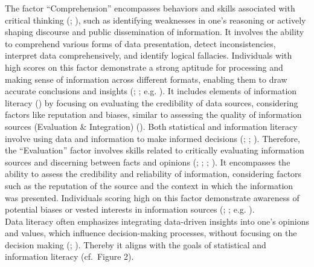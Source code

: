 \documentclass[
  12pt,
  a4paper,
  twoside]{article}
\begin{document}
The factor ``Comprehension'' encompasses behaviors and skills associated with critical thinking (; ), such as identifying weaknesses in one's reasoning or actively shaping discourse and public dissemination of information. It involves the ability to comprehend various forms of data presentation, detect inconsistencies, interpret data comprehensively, and identify logical fallacies. Individuals with high scores on this factor demonstrate a strong aptitude for processing and making sense of information across different formats, enabling them to draw accurate conclusions and insights (; ; e.g. ).
It includes elements of information literacy () by focusing on evaluating the credibility of data sources, considering factors like reputation and biases, similar to assessing the quality of information sources (Evaluation \& Integration) (). Both statistical and information literacy involve using data and information to make informed decisions (; ; ).
Therefore, the ``Evaluation'' factor involves skills related to critically evaluating information sources and discerning between facts and opinions (; ; ; ). It encompasses the ability to assess the credibility and reliability of information, considering factors such as the reputation of the source and the context in which the information was presented. Individuals scoring high on this factor demonstrate awareness of potential biases or vested interests in information sources (; ; e.g. ).\\
Data literacy often emphasizes integrating data-driven insights into one's opinions and values, which influence decision-making processes, without focusing on the decision making (; ). Thereby it aligns with the goals of statistical and information literacy (cf.~Figure 2).
\end{document}
